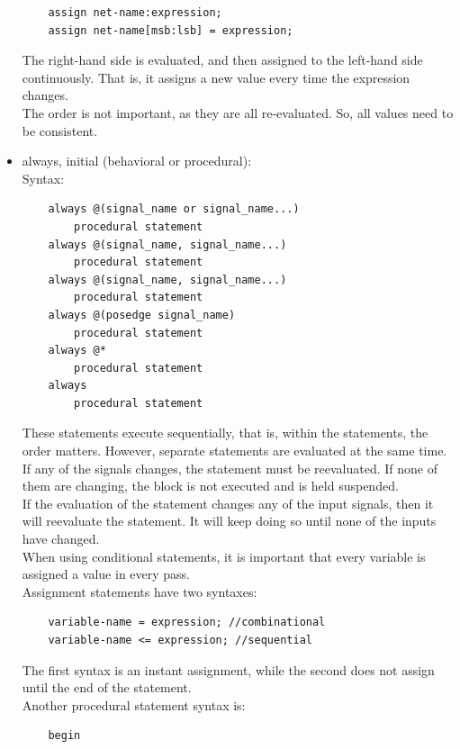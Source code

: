 \documentclass[nobib]{tufte-handout}
\begin{document}
\begin{itemize}
\begin{lstlisting}
    assign net-name:expression;
    assign net-name[msb:lsb] = expression;
    \end{lstlisting}
              The right-hand side is evaluated, and then assigned to the left-hand side
              continuously. That is, it assigns a new value every time the expression
              changes.\\ The order is not important, as they are all re-evaluated. So, all
              values need to be consistent.\\
        \item always, initial (behavioral or procedural):\\ Syntax:
              \begin{lstlisting}
    always @(signal_name or signal_name...)
        procedural statement
    always @(signal_name, signal_name...)
        procedural statement
    always @(signal_name, signal_name...)
        procedural statement
    always @(posedge signal_name)
        procedural statement
    always @*
        procedural statement
    always
        procedural statement
    \end{lstlisting}
              These statements execute sequentially, that is, within the statements, the
              order matters. However, separate statements are evaluated at the same time.\\
              If any of the signals changes, the statement must be reevaluated. If none of
              them are changing, the block is not executed and is held suspended.\\ If the
              evaluation of the statement changes any of the input signals, then it will
              reevaluate the statement. It will keep doing so until none of the inputs have
              changed.\\ When using conditional statements, it is important that every
              variable is assigned a value in every pass.\\ Assignment statements have two
              syntaxes:
              \begin{lstlisting}
    variable-name = expression; //combinational
    variable-name <= expression; //sequential
    \end{lstlisting}
              The first syntax is an instant assignment, while the second does not assign
              until the end of the statement.\\ Another procedural statement syntax is:
              \begin{lstlisting}
    begin

\end{lstlisting}
\end{itemize}
\end{document}
